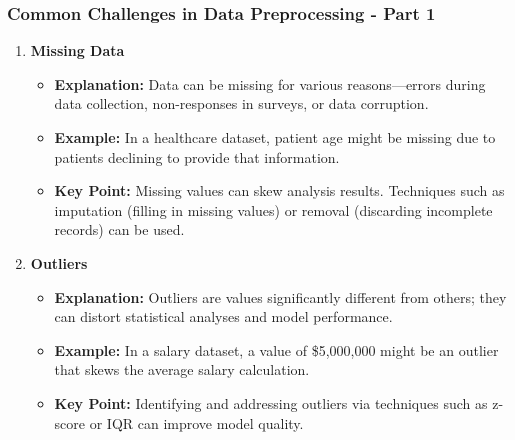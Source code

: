 \documentclass[aspectratio=169]{beamer}
\begin{document}
\begin{frame}[fragile]
    \frametitle{Common Challenges in Data Preprocessing - Part 1}
    \begin{enumerate}
        \item \textbf{Missing Data}
            \begin{itemize}
                \item \textbf{Explanation:} Data can be missing for various reasons—errors during data collection, non-responses in surveys, or data corruption.
                \item \textbf{Example:} In a healthcare dataset, patient age might be missing due to patients declining to provide that information.
                \item \textbf{Key Point:} Missing values can skew analysis results. Techniques such as imputation (filling in missing values) or removal (discarding incomplete records) can be used.
            \end{itemize}
        
        \item \textbf{Outliers}
            \begin{itemize}
                \item \textbf{Explanation:} Outliers are values significantly different from others; they can distort statistical analyses and model performance.
                \item \textbf{Example:} In a salary dataset, a value of \$5,000,000 might be an outlier that skews the average salary calculation.
                \item \textbf{Key Point:} Identifying and addressing outliers via techniques such as z-score or IQR can improve model quality.
            \end{itemize}
    \end{enumerate}
\end{frame}
\end{document}
